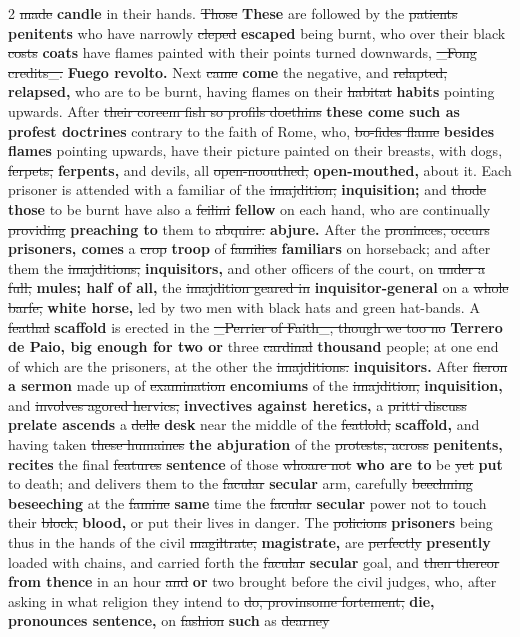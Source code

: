 \documentclass[10pt]{article}
\begin{document}
\begin{multicols}{2}
\sout{made} \textbf{candle} in their hands. \sout{Those} \textbf{These} are followed by the \sout{patients} \textbf{penitents} who have narrowly \sout{cleped} \textbf{escaped} being burnt, who over their black \sout{costs} \textbf{coats} have flames painted with their points turned downwards, \sout{\_Fong credits\_.} \textbf{Fuego revolto.} Next \sout{came} \textbf{come} the negative, and \sout{relapted,} \textbf{relapsed,} who are to be burnt, having flames on their \sout{habitat} \textbf{habits} pointing upwards. After \sout{their coreem fish so profils doethins} \textbf{these come such as profest doctrines} contrary to the faith of Rome, who, \sout{bo-fides flame} \textbf{besides flames} pointing upwards, have their picture painted on their breasts, with dogs, \sout{ferpets,} \textbf{ferpents,} and devils, all \sout{open-noouthed,} \textbf{open-mouthed,} about it. Each prisoner is attended with a familiar of the \sout{imajdition;} \textbf{inquisition;} and \sout{thode} \textbf{those} to be burnt have also a \sout{feilini} \textbf{fellow} on each hand, who are continually \sout{providing} \textbf{preaching to} them to \sout{abquire.} \textbf{abjure.} After the \sout{proninces, occurs} \textbf{prisoners, comes} a \sout{crop} \textbf{troop} of \sout{families} \textbf{familiars} on horseback; and after them the \sout{imajditions,} \textbf{inquisitors,} and other officers of the court, on \sout{under a full,} \textbf{mules; half of all,} the \sout{imajdition geared in} \textbf{inquisitor-general} on a \sout{whole barfe,} \textbf{white horse,} led by two men with black hats and green hat-bands. A \sout{feathal} \textbf{scaffold} is erected in the \sout{\_Perrier of Faith\_, though we too no} \textbf{Terrero de Paio, big enough for two or} three \sout{cardinal} \textbf{thousand} people; at one end of which are the prisoners, at the other the \sout{imajditions.} \textbf{inquisitors.} After \sout{fieron} \textbf{a sermon} made up of \sout{examination} \textbf{encomiums} of the \sout{imajdition,} \textbf{inquisition,} and \sout{involves agored hervics,} \textbf{invectives against heretics,} a \sout{pritti discuss} \textbf{prelate ascends} a \sout{delle} \textbf{desk} near the middle of the \sout{featlold,} \textbf{scaffold,} and having taken \sout{these humaines} \textbf{the abjuration} of the \sout{protests, across} \textbf{penitents, recites} the final \sout{features} \textbf{sentence} of those \sout{whoare not} \textbf{who are to} be \sout{yet} \textbf{put} to death; and delivers them to the \sout{facular} \textbf{secular} arm, carefully \sout{beechning} \textbf{beseeching} at the \sout{famine} \textbf{same} time the \sout{facular} \textbf{secular} power not to touch their \sout{block,} \textbf{blood,} or put their lives in danger. The \sout{policions} \textbf{prisoners} being thus in the hands of the civil \sout{magiltrate,} \textbf{magistrate,} are \sout{perfectly} \textbf{presently} loaded with chains, and carried forth the \sout{facular} \textbf{secular} goal, and \sout{then thereor} \textbf{from thence} in an hour \sout{and} \textbf{or} two brought before the civil judges, who, after asking in what religion they intend to \sout{do, provinsome fortement,} \textbf{die, pronounces sentence,} on \sout{fashion} \textbf{such} as \sout{dearney} 
\end{multicols}
\end{document}

